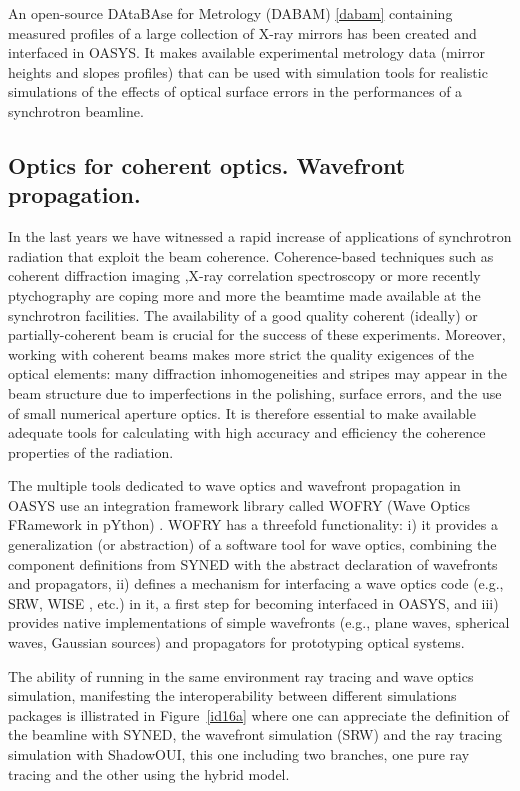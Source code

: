 \documentclass{aip-cp}
\begin{document}
An open-source DAtaBAse for Metrology (DABAM) \ref{dabam} containing measured profiles of a large collection of X-ray mirrors has been created and interfaced in OASYS. It makes available experimental metrology data (mirror heights and slopes profiles) that can be used with simulation tools for realistic simulations of the effects of optical surface errors in the performances of a synchrotron beamline.


\subsection{Optics for coherent optics. Wavefront propagation.}

In the last years we have witnessed a rapid increase of applications of synchrotron radiation that exploit the beam coherence. Coherence-based techniques such as coherent diffraction imaging ,X-ray correlation spectroscopy or more recently ptychography are coping more and more the beamtime made available at the synchrotron facilities. The availability of a good quality coherent (ideally) or partially-coherent beam is crucial for the success of these experiments. Moreover, working with coherent beams makes more strict the quality exigences of the optical elements: many diffraction inhomogeneities and stripes may appear in the beam structure due to imperfections in the polishing, surface errors, and the use of small numerical aperture optics. It is therefore essential to make available adequate tools for calculating with high accuracy and efficiency the coherence properties of the radiation. 

The multiple tools dedicated to wave optics and wavefront propagation in OASYS use an integration framework library called WOFRY (Wave Optics FRamework in pYthon) \cite{oasys2}. WOFRY has a threefold functionality: i) it provides a generalization (or abstraction) of a software tool for wave optics, combining the component definitions from SYNED with the abstract declaration of wavefronts and propagators, ii) defines a mechanism for interfacing a wave optics code (e.g., SRW, WISE \cite{wise}, etc.) in it, a first step for becoming interfaced in OASYS, and iii) provides native implementations of simple wavefronts (e.g., plane waves, spherical waves, Gaussian sources) and propagators for prototyping optical systems.

The ability of running in the same environment ray tracing and wave optics simulation, manifesting the interoperability between different simulations packages is illistrated in Figure~\ref{id16a} where one can appreciate the definition of the beamline with SYNED, the wavefront simulation (SRW) and the ray tracing simulation with ShadowOUI, this one including two branches, one pure ray tracing and the other using the hybrid model. 
\end{document}
